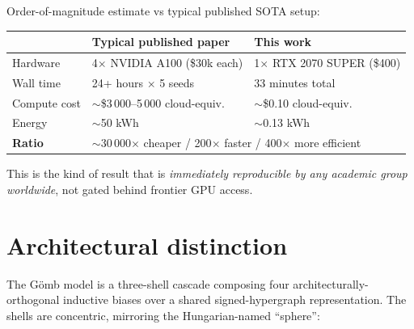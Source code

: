 \documentclass[11pt,a4paper]{article}
\newcommand{\sig}{\ensuremath{\sigma}}
\begin{document}
Order-of-magnitude estimate vs typical published SOTA setup:

\begin{center}
\begin{tabular}{lll}
\toprule
                & \textbf{Typical published paper}            & \textbf{This work}            \\
\midrule
Hardware        & 4$\times$ NVIDIA A100 (\$30k each)         & 1$\times$ RTX 2070 SUPER (\$400) \\
Wall time       & 24+ hours $\times$ 5 seeds                 & 33 minutes total              \\
Compute cost    & $\sim$\$3\,000--5\,000 cloud-equiv.         & $\sim$\$0.10 cloud-equiv.     \\
Energy          & $\sim$50 kWh                                & $\sim$0.13 kWh                \\
\midrule
\textbf{Ratio}  & \multicolumn{2}{l}{$\sim$30\,000$\times$ cheaper / 200$\times$ faster / 400$\times$ more efficient} \\
\bottomrule
\end{tabular}
\end{center}

This is the kind of result that is \emph{immediately reproducible
by any academic group worldwide}, not gated behind frontier GPU
access.

\section{Architectural distinction}

The G\"omb model is a three-shell cascade composing four
architecturally-orthogonal inductive biases over a shared
signed-hypergraph representation. The shells are concentric,
mirroring the Hungarian-named ``sphere'':

\begin{center}
\end{center}
\end{document}
